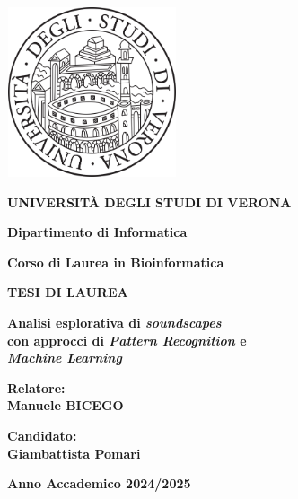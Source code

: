 \begin{titlepage}

\begin{center}
	
	
	\includegraphics[width=5cm,height=5cm]{./img/stemma_univr.png}
	\vspace{6mm}
	
	{\Large{\bf{UNIVERSITÀ DEGLI STUDI DI VERONA}}}
	\vspace{8mm}
	
	{\large{\bf{Dipartimento di Informatica}}} 
	\vspace{6mm}		
	
	{\Large{\bf{Corso di Laurea in Bioinformatica}}}
	
	\vspace{30mm}
	{\large{\bf{TESI DI LAUREA }}}
	\vspace{10mm}
	
	{\Huge{\bf Analisi esplorativa di \textit{soundscapes} }}\\
	\vspace{3mm}
	{\Huge{\bf con approcci di \textit{Pattern Recognition} e}}\\
	\vspace{3mm}
	{\Huge{\bf \textit{Machine Learning}}}\\
	\vspace{3mm}
	
\end{center}		

\vspace{40mm}	
\begin{minipage}[t]{0.40\textwidth}
	{\large{\bf Relatore: \\ Manuele BICEGO}}			
\end{minipage}
\hfill
\begin{minipage}[t]{0.40\textwidth}\raggedleft
	{\large{\bf Candidato: \\ Giambattista Pomari}}
\end{minipage}

\vspace{10mm}
\hrulefill
\begin{center}
	{\large{\bf Anno Accademico 2024/2025\\}}
\end{center}

\end{titlepage}
